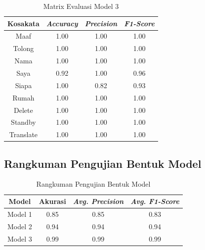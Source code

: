 \newpage
\begin{longtable}{|c|c|c|c|}
  \caption{Matrix Evaluasi Model 3}
  \label{tb:model3stat}                                   \\
  \hline
  \rowcolor[HTML]{C0C0C0}
  \textbf{Kosakata} & \textbf{\emph{Accuracy}} & \textbf{\emph{Precision}} & \textbf{\emph{F1-Score}} \\
  \hline
  Maaf              & 1.00                        & 1.00                   & 1.00                \\
  Tolong            & 1.00                        & 1.00                   & 1.00                \\
  Nama              & 1.00                        & 1.00                   & 1.00                \\
  Saya              & 0.92                        & 1.00                   & 0.96                \\
  Siapa             & 1.00                        & 0.82                   & 0.93                \\
  Rumah             & 1.00                        & 1.00                   & 1.00                \\
  Delete            & 1.00                        & 1.00                   & 1.00                \\
  Standby           & 1.00                        & 1.00                   & 1.00                \\
  Translate         & 1.00                        & 1.00                   & 1.00                \\
  \hline
\end{longtable}

\subsection{Rangkuman Pengujian Bentuk Model}
\label{sec:analisismodelseluruh}

\begin{longtable}{|c|c|c|c|}
  \caption{Rangkuman Pengujian Bentuk Model}
  \label{tb:evaluasiModel}                                   \\
  \hline
  \rowcolor[HTML]{C0C0C0}
  \textbf{Model} & \textbf{Akurasi} & \emph{\textbf{Avg. Precision}} & \emph{\textbf{Avg. F1-Score}} \\
  \hline
  Model 1 & 0.85 & 0.85 & 0.83 \\
  Model 2 & 0.94 & 0.94 & 0.94 \\
  Model 3 & 0.99 & 0.99 & 0.99 \\
  \hline
\end{longtable}

